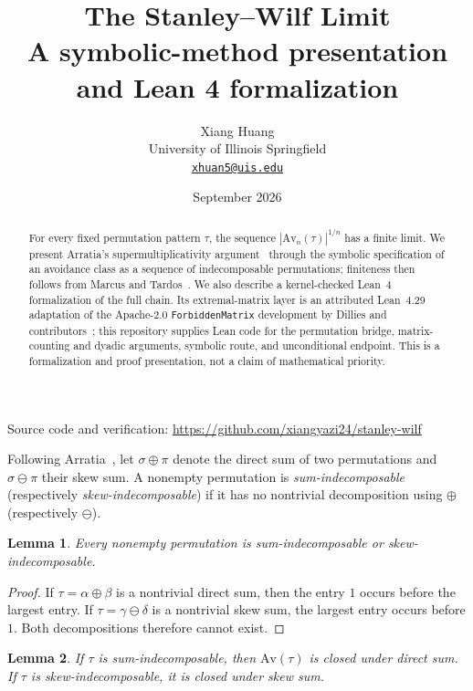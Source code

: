 \documentclass[10pt]{article}
\title{The Stanley--Wilf Limit\\
  \large A symbolic-method presentation and Lean 4 formalization}
\author{Xiang Huang\\[2pt]
  \small University of Illinois Springfield\\
  \small\href{mailto:xhuan5@uis.edu}{\texttt{xhuan5@uis.edu}}}
\date{September 2026}
\newtheorem{lemma}{Lemma}
\newcommand{\Av}{\mathrm{Av}}
\begin{document}
\maketitle
\begin{center}
\small Source code and verification:\quad
\url{https://github.com/xiangyazi24/stanley-wilf}
\end{center}

\begin{abstract}
For every fixed permutation pattern $\tau$, the sequence
$|\Av_n(\tau)|^{1/n}$ has a finite limit.  We present Arratia's
supermultiplicativity argument~\cite{Arratia} through the symbolic
specification of an avoidance class as a sequence of indecomposable
permutations; finiteness then follows from Marcus and
Tardos~\cite{MarcusTardos}.  We also describe a kernel-checked Lean~4
formalization of the full chain.  Its extremal-matrix layer is an attributed
Lean~4.29 adaptation of the Apache-2.0 \texttt{ForbiddenMatrix} development by
Dillies and contributors~\cite{ForbiddenMatrix}; this repository supplies Lean
code for the permutation bridge, matrix-counting and dyadic arguments,
symbolic route, and unconditional endpoint.  This is a formalization and proof
presentation, not a claim of mathematical priority.
\end{abstract}

Following Arratia~\cite{Arratia}, let $\sigma\oplus\pi$ denote the direct sum
of two permutations and $\sigma\ominus\pi$ their skew sum.  A nonempty permutation is
\emph{sum-indecomposable} (respectively \emph{skew-indecomposable}) if it has
no nontrivial decomposition using $\oplus$ (respectively $\ominus$).

\begin{lemma}\label{lem:dichotomy}
Every nonempty permutation is sum-indecomposable or skew-indecomposable.
\end{lemma}

\begin{proof}
If $\tau=\alpha\oplus\beta$ is a nontrivial direct sum, then the entry $1$
occurs before the largest entry.  If
$\tau=\gamma\ominus\delta$ is a nontrivial skew sum, the largest entry occurs
before $1$.  Both decompositions therefore cannot exist.
\end{proof}

\begin{lemma}\label{lem:closure}
If $\tau$ is sum-indecomposable, then $\Av(\tau)$ is closed under direct sum.
If $\tau$ is skew-indecomposable, it is closed under skew sum.
\end{lemma}
\end{document}

